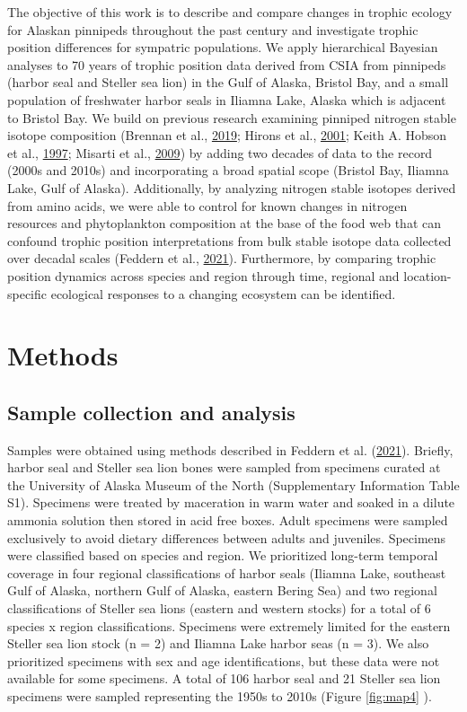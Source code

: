 \documentclass [11pt, proquest] {uwthesis}[2015/03/03]
\begin{document}
The objective of this work is to describe and compare changes in trophic
ecology for Alaskan pinnipeds throughout the past century and
investigate trophic position differences for sympatric populations. We
apply hierarchical Bayesian analyses to 70 years of trophic position
data derived from CSIA from pinnipeds (harbor seal and Steller sea lion)
in the Gulf of Alaska, Bristol Bay, and a small population of freshwater
harbor seals in Iliamna Lake, Alaska which is adjacent to Bristol Bay.
We build on previous research examining pinniped nitrogen stable isotope
composition (Brennan et al., \protect\hyperlink{ref-Brennan2019}{2019};
Hirons et al., \protect\hyperlink{ref-Hirons2001}{2001}; Keith A. Hobson
et al., \protect\hyperlink{ref-Hobson1997}{1997}; Misarti et al.,
\protect\hyperlink{ref-Misarti2009}{2009}) by adding two decades of data
to the record (2000s and 2010s) and incorporating a broad spatial scope
(Bristol Bay, Iliamna Lake, Gulf of Alaska). Additionally, by analyzing
nitrogen stable isotopes derived from amino acids, we were able to
control for known changes in nitrogen resources and phytoplankton
composition at the base of the food web that can confound trophic
position interpretations from bulk stable isotope data collected over
decadal scales (Feddern et al.,
\protect\hyperlink{ref-Feddern2021}{2021}). Furthermore, by comparing
trophic position dynamics across species and region through time,
regional and location-specific ecological responses to a changing
ecosystem can be identified.

\section{Methods}\label{methods-2}

\subsection{Sample collection and
analysis}\label{sample-collection-and-analysis-1}

Samples were obtained using methods described in Feddern et al.
(\protect\hyperlink{ref-Feddern2021}{2021}). Briefly, harbor seal and
Steller sea lion bones were sampled from specimens curated at the
University of Alaska Museum of the North (Supplementary Information
Table S1). Specimens were treated by maceration in warm water and soaked
in a dilute ammonia solution then stored in acid free boxes. Adult
specimens were sampled exclusively to avoid dietary differences between
adults and juveniles. Specimens were classified based on species and
region. We prioritized long-term temporal coverage in four regional
classifications of harbor seals (Iliamna Lake, southeast Gulf of Alaska,
northern Gulf of Alaska, eastern Bering Sea) and two regional
classifications of Steller sea lions (eastern and western stocks) for a
total of 6 species x region classifications. Specimens were extremely
limited for the eastern Steller sea lion stock (n = 2) and Iliamna Lake
harbor seas (n = 3). We also prioritized specimens with sex and age
identifications, but these data were not available for some specimens. A
total of 106 harbor seal and 21 Steller sea lion specimens were sampled
representing the 1950s to 2010s (Figure \ref{fig:map4} ).
\end{document}
